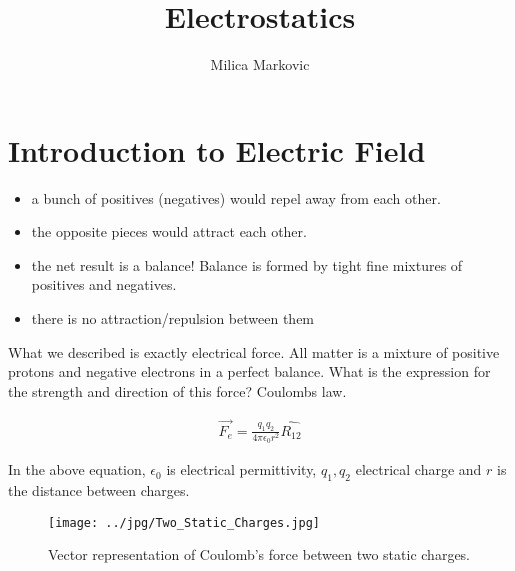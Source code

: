 





 
\title{Electrostatics} 
\author{Milica Markovic} 
  
\begin{abstract}  

\end{abstract}  
\maketitle    


\section{Introduction to Electric Field}


\begin{itemize}
\item a bunch of positives (negatives) would repel away from each other.
\item the opposite pieces would attract each other.
\item the net result is a balance! Balance is formed by tight fine mixtures of positives and negatives.
\item there is no attraction/repulsion between them
\end{itemize}
 

What we described is exactly electrical force. All matter is a mixture of positive protons and negative electrons in a perfect balance. What is the expression for the strength and direction of this force? Coulombs law.

\begin{eqnarray}
\vec{F_e}=\frac{q_1 q_2}{4 \pi \epsilon_0 r^2} \hat{R_{12}}
\end{eqnarray}\label{Coulombslaw}

In the above equation, $\epsilon_0$ is electrical permittivity, $q_1,q_2$ electrical charge and $r$ is the distance between charges.


\begin{figure}[htbp]
\begin{center}
\texttt{[image: ../jpg/Two\_Static\_Charges.jpg]}
\end{center}
\caption{Vector representation of Coulomb's force between two static charges.}
\label{twostaticch}
\end{figure}



